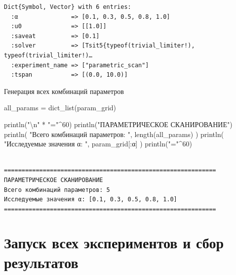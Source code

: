 \documentclass[
  russian,
  12pt,
  a4paper,
  DIV=11,
  numbers=noendperiod]{scrreprt}
\newenvironment{Shaded}{\begin{snugshade}}{\end{snugshade}}
\newcommand{\FloatTok}[1]{\textcolor[rgb]{0.68,0.00,0.00}{#1}}
\newcommand{\FunctionTok}[1]{\textcolor[rgb]{0.28,0.35,0.67}{#1}}
\newcommand{\NormalTok}[1]{\textcolor[rgb]{0.00,0.23,0.31}{#1}}
\newcommand{\OperatorTok}[1]{\textcolor[rgb]{0.37,0.37,0.37}{#1}}
\newcommand{\SpecialCharTok}[1]{\textcolor[rgb]{0.37,0.37,0.37}{#1}}
\newcommand{\StringTok}[1]{\textcolor[rgb]{0.13,0.47,0.30}{#1}}
\begin{document}
\begin{verbatim}
Dict{Symbol, Vector} with 6 entries:
  :α               => [0.1, 0.3, 0.5, 0.8, 1.0]
  :u0              => [[1.0]]
  :saveat          => [0.1]
  :solver          => [Tsit5{typeof(trivial_limiter!), typeof(trivial_limiter!)…
  :experiment_name => ["parametric_scan"]
  :tspan           => [(0.0, 10.0)]
\end{verbatim}

Генерация всех комбинаций параметров

\begin{Shaded}
\begin{Highlighting}[]
\NormalTok{all\_params }\OperatorTok{=} \FunctionTok{dict\_list}\NormalTok{(param\_grid)}

\FunctionTok{println}\NormalTok{(}\StringTok{"}\SpecialCharTok{\textbackslash{}n}\StringTok{"} \OperatorTok{*} \StringTok{"="}\OperatorTok{\^{}}\FloatTok{60}\NormalTok{)}
\FunctionTok{println}\NormalTok{(}\StringTok{"ПАРАМЕТРИЧЕСКОЕ СКАНИРОВАНИЕ"}\NormalTok{)}
\FunctionTok{println}\NormalTok{(}
    \StringTok{"Всего комбинаций параметров: "}\NormalTok{,}
    \FunctionTok{length}\NormalTok{(all\_params)}
\NormalTok{)}
\FunctionTok{println}\NormalTok{(}
    \StringTok{"Исследуемые значения α: "}\NormalTok{,}
\NormalTok{    param\_grid[}\OperatorTok{:}\NormalTok{α]}
\NormalTok{)}
\FunctionTok{println}\NormalTok{(}\StringTok{"="}\OperatorTok{\^{}}\FloatTok{60}\NormalTok{)}
\end{Highlighting}
\end{Shaded}

\begin{verbatim}

============================================================
ПАРАМЕТРИЧЕСКОЕ СКАНИРОВАНИЕ
Всего комбинаций параметров: 5
Исследуемые значения α: [0.1, 0.3, 0.5, 0.8, 1.0]
============================================================
\end{verbatim}

\section{Запуск всех экспериментов и сбор
результатов}\label{ux437ux430ux43fux443ux441ux43a-ux432ux441ux435ux445-ux44dux43aux441ux43fux435ux440ux438ux43cux435ux43dux442ux43eux432-ux438-ux441ux431ux43eux440-ux440ux435ux437ux443ux43bux44cux442ux430ux442ux43eux432}
\end{document}
